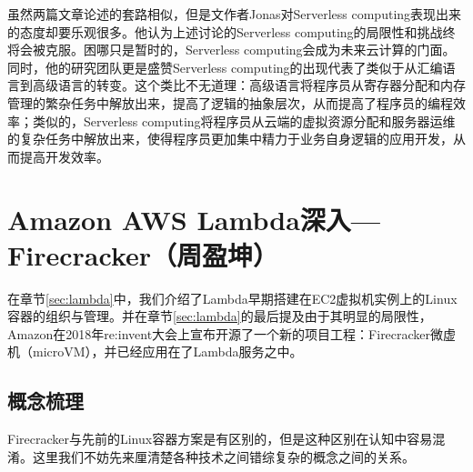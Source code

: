 \documentclass[11pt]{article}
\begin{document}
虽然两篇文章论述的套路相似，但是文作者Jonas对Serverless computing表现出来的态度却要乐观很多。他认为上述讨论的Serverless computing的局限性和挑战终将会被克服。困哪只是暂时的，Serverless computing会成为未来云计算的门面\cite{jonas2019cloud}。同时，他的研究团队更是盛赞Serverless computing的出现代表了类似于从汇编语言到高级语言的转变\cite{jonas2019cloud}。这个类比不无道理：高级语言将程序员从寄存器分配和内存管理的繁杂任务中解放出来，提高了逻辑的抽象层次，从而提高了程序员的编程效率；类似的，Serverless computing将程序员从云端的虚拟资源分配和服务器运维的复杂任务中解放出来，使得程序员更加集中精力于业务自身逻辑的应用开发，从而提高开发效率。

\section{Amazon AWS Lambda深入---Firecracker（周盈坤）}\label{sec:Firecracker}
在章节\ref{sec:lambda}中，我们介绍了Lambda早期搭建在EC2虚拟机实例上的Linux容器的组织与管理。并在章节\ref{sec:lambda}的最后提及由于其明显的局限性，Amazon在2018年re:invent大会上宣布开源了一个新的项目工程：Firecracker微虚机（microVM），并已经应用在了Lambda服务之中。

\subsection{概念梳理}
Firecracker与先前的Linux容器方案是有区别的，但是这种区别在认知中容易混淆。这里我们不妨先来厘清楚各种技术之间错综复杂的概念之间的关系。
\end{document}
